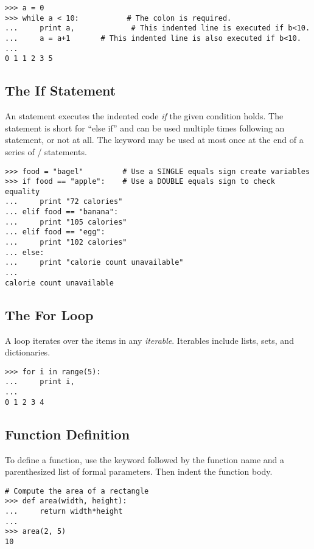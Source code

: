 \begin{lstlisting}
>>> a = 0
>>> while a < 10:           # The colon is required.
...     print a,             # This indented line is executed if b<10.
...     a = a+1       # This indented line is also executed if b<10.
...     
0 1 1 2 3 5
\end{lstlisting}


\subsection*{The If Statement}
An  statement executes the 
indented code \emph{if} the given condition holds.
The  statement is short for ``else if'' and can be used multiple times following an  statement, or not at all. 
The  keyword may be used at most once at the end of a series of / statements.
\begin{lstlisting}
>>> food = "bagel"         # Use a SINGLE equals sign create variables
>>> if food == "apple":    # Use a DOUBLE equals sign to check equality
...     print "72 calories"
... elif food == "banana":
...     print "105 calories"
... elif food == "egg":
...     print "102 calories"
... else: 
...     print "calorie count unavailable"
...     
calorie count unavailable
\end{lstlisting}


\subsection*{The For Loop}
A  loop iterates over the items in any \emph{iterable}. Iterables include lists, sets, and dictionaries.

\begin{lstlisting}
>>> for i in range(5):
...     print i,
...     
0 1 2 3 4
\end{lstlisting}


\subsection*{Function Definition}
To define a function, use the  keyword followed by the function name and a parenthesized list of formal parameters. Then indent the function body.
\begin{lstlisting}
# Compute the area of a rectangle
>>> def area(width, height):
...     return width*height
...         
>>> area(2, 5)
10
\end{lstlisting}

